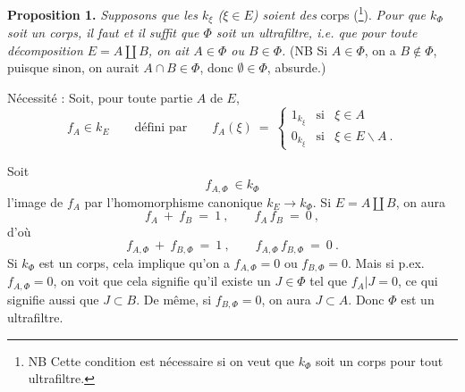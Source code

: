 
\noindent\textbf{Proposition 1.} \textit{Supposons que les $k_\xi$ ($\xi\in E$) soient des} corps (\footnote[203]{NB Cette condition est nécessaire si on veut que $k_\Phi$ soit un corps pour tout ultrafiltre.}). \textit{Pour que $k_\Phi$ soit un corps, il faut et il suffit que $\Phi$ soit un ultrafiltre, i.e. que pour toute décomposition $E=A\amalg B$, on ait $A\in\Phi$ ou $B\in\Phi$.} (NB Si $A\in\Phi$, on a $B\notin\Phi$, puisque sinon, on aurait $A\cap B\in\Phi$, donc $\emptyset\in\Phi$, absurde.)

\noindent Nécessité : Soit, pour toute partie $A$ de $E$,
\[
f_A\in k_E \qquad \text{défini par} \qquad f_A(\xi) \ = \ \left\{
\begin{array}{lll}
1_{k_\xi} & \text{si} & \xi\in A\\[1ex]
0_{k_\xi} & \text{si} & \xi\in E\backslash A \ .
\end{array}\right.
\]

\noindent Soit
\[
f_{A,\Phi} \ \in k_\Phi
\]
l'image de $f_A$ par l'homomorphisme canonique $k_E\longrightarrow k_\Phi$. Si $E=A\amalg B$, on aura
\[
f_A \ + \ f_B \ = \ 1 \ , \qquad f_A\, f_B \ = \ 0 \ ,
\]
d'où
\[
f_{A,\Phi} \ + \ f_{B,\Phi} \ = \ 1 \ , \qquad f_{A,\Phi}\, f_{B,\Phi} \ = \ 0 \ .
\]
Si $k_\Phi$ est un corps, cela implique qu'on a $f_{A,\Phi}=0$ ou $f_{B,\Phi}=0$. Mais si p.ex. $f_{A,\Phi}=0$, on voit que cela signifie qu'il existe un $J\in\Phi$ tel que $f_A|J=0$, ce qui signifie aussi que $J\subset B$. De même, si $f_{B,\Phi}=0$, on aura $J\subset A$. Donc $\Phi$ est un ultrafiltre.

